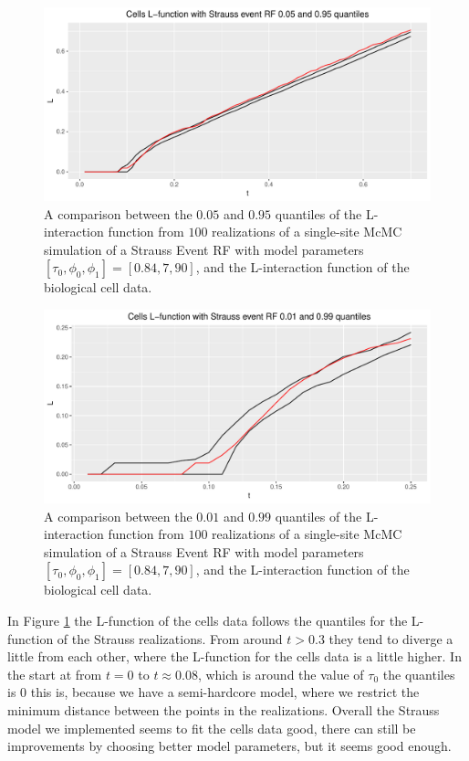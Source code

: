 \begin{figure}
    \centering
    \includegraphics[scale=0.65]{figures/strauss_quant1.pdf}
    \caption{A comparison between the $0.05$ and $0.95$ quantiles of the L-interaction function from $100$ realizations of a single-site McMC simulation of a Strauss Event RF with model parameters $[\tau_0,\phi_0,\phi_1] = [0.84,7,90]$, and the L-interaction function of the biological cell data.}
    \label{fig:strauss_quant1}
\end{figure}

\begin{figure}
    \centering
    \includegraphics[scale=0.65]{figures/strauss_quant2.pdf}
    \caption{A comparison between the $0.01$ and $0.99$ quantiles of the L-interaction function from $100$ realizations of a single-site McMC simulation of a Strauss Event RF with model parameters $[\tau_0,\phi_0,\phi_1] = [0.84,7,90]$, and the L-interaction function of the biological cell data.}
    \label{fig:strauss_quant2}
\end{figure}

In Figure \ref{fig:strauss_quant1} the L-function of the cells data follows the quantiles for the L-function of the Strauss realizations. From around $t>0.3$ they tend to diverge a little from each other, where the L-function for the cells data is a little higher. In the start at from $t=0$ to $t\approx 0.08$, which is around the value of $\tau_0$ the quantiles is $0$ this is, because we have a semi-hardcore model, where we restrict the minimum distance between the points in the realizations. Overall the Strauss model we implemented seems to fit the cells data good, there can still be improvements by choosing better model parameters, but it seems good enough.